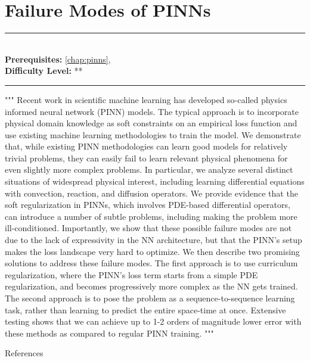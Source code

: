 \documentclass[book.tex]{subfiles}
\begin{document}
\chapter{Failure Modes of PINNs}

\label{chap:cormorant}
\noindent\rule{11cm}{0.4pt} \\
\textbf{Prerequisites:} \autoref{chap:pinns},  \\
\textbf{Difficulty Level:} ** \\
\noindent\rule{11cm}{0.4pt}
\vspace{5mm}
"""
Recent work in scientific machine learning has developed so-called physics informed neural network (PINN) models. The typical approach is to incorporate physical domain knowledge as soft constraints on an empirical loss function and use existing machine learning methodologies to train the model. We demonstrate that, while existing PINN methodologies can learn good models for relatively trivial problems, they can easily fail to learn relevant physical phenomena for even slightly more complex problems. In particular, we analyze several distinct situations of widespread physical interest, including learning differential equations with convection, reaction, and diffusion operators. We provide evidence that the soft regularization in PINNs, which involves PDE-based differential operators, can introduce a number of subtle problems, including making the problem more ill-conditioned. Importantly, we show that these possible failure modes are not due to the lack of expressivity in the NN architecture, but that the PINN’s setup makes the loss landscape very hard to optimize. We then describe two promising solutions to address these failure modes. The first approach is to use curriculum regularization, where the PINN’s loss term starts from a simple PDE regularization, and becomes progressively more complex as the NN gets trained. The second approach is to pose the problem as a sequence-to-sequence learning task, rather than learning to predict the entire space-time at once. Extensive testing shows that we can achieve up to 1-2 orders of magnitude lower error with these methods as compared to regular PINN training.
"""

References \cite{krishnapriyan2021characterizing}
\end{document}
